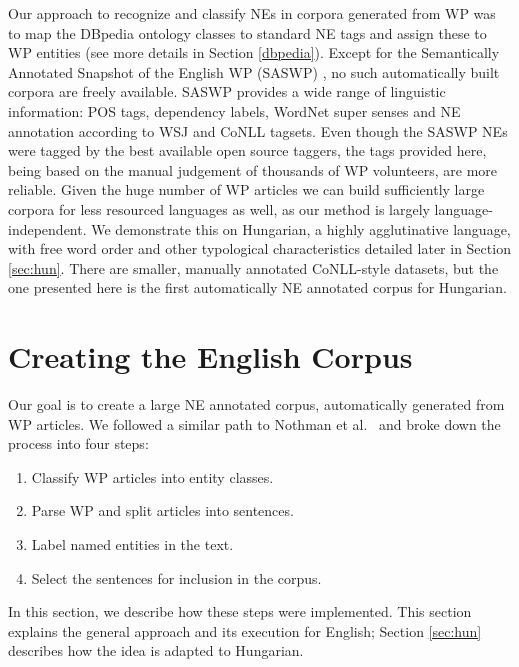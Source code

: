 \documentclass[11pt]{article}
\begin{document}
Our approach to recognize and classify NEs in corpora generated from WP was to
map the DBpedia ontology classes to standard NE tags and assign these to WP
entities (see more details in Section \ref{dbpedia}). Except for the
Semantically Annotated Snapshot of the English WP (SASWP) \cite{Zaragoza:07},
no such automatically built corpora are freely available. SASWP provides a
wide range of linguistic information: POS tags, dependency labels, WordNet
super senses and NE annotation according to WSJ and CoNLL tagsets. Even though
the SASWP NEs were tagged by the best available open source taggers, the tags 
provided here, being based on the manual judgement of thousands of WP
volunteers, are more reliable. Given the huge number of WP articles we can
build sufficiently large corpora for less resourced languages as well, as our
method is largely language-independent. We demonstrate this on Hungarian, a
highly agglutinative language, with free word order and other typological 
characteristics detailed later in Section \ref{sec:hun}. There are smaller, manually annotated CoNLL-style datasets, but the one presented here is the first automatically NE annotated corpus for Hungarian.

\section{Creating the English Corpus} 
\label{sec:create}

Our goal is to create a large NE annotated corpus, automatically generated
from WP articles. We followed a similar path to Nothman et
al.~ and broke down the process into four steps:

\begin{enumerate}
\item Classify WP articles into entity classes.
\item Parse WP and split articles into sentences.
\item Label named entities in the text.
\item Select the sentences for inclusion in the corpus.
\end{enumerate}

In this section, we describe how these steps were implemented. This section explains the general approach and its execution for English; Section \ref{sec:hun} describes how the idea is adapted to Hungarian.

\end{document}
